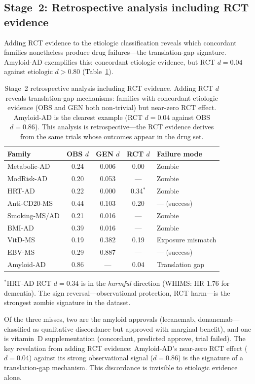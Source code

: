 \documentclass[11pt]{article}
\begin{document}
\subsection{Stage~2: Retrospective analysis including RCT evidence}
\label{sec:stage2}

Adding RCT evidence to the etiologic classification reveals which concordant families nonetheless produce drug failures---the translation-gap signature. Amyloid-AD exemplifies this: concordant etiologic evidence, but RCT $d = 0.04$ against etiologic $d > 0.80$ (Table~\ref{tab:stage2}).

\begin{table}[t]
\centering
\caption{Stage~2 retrospective analysis including RCT evidence. Adding RCT $d$ reveals translation-gap mechanisms: families with concordant etiologic evidence (OBS and GEN both non-trivial) but near-zero RCT effect. Amyloid-AD is the clearest example (RCT $d = 0.04$ against OBS $d = 0.86$). This analysis is retrospective---the RCT evidence derives from the same trials whose outcomes appear in the drug set.}
\label{tab:stage2}
\begin{tabular}{lcccl}
\toprule
Family & OBS $d$ & GEN $d$ & RCT $d$ & Failure mode \\
\midrule
Metabolic-AD & 0.24 & 0.006 & 0.00 & Zombie \\
ModRisk-AD & 0.20 & 0.053 & --- & Zombie \\
HRT-AD & 0.22 & 0.000 & 0.34$^*$ & Zombie \\
Anti-CD20-MS & 0.44 & 0.103 & 0.20 & --- (success) \\
Smoking-MS/AD & 0.21 & 0.016 & --- & Zombie \\
BMI-AD & 0.39 & 0.016 & --- & Zombie \\
VitD-MS & 0.19 & 0.382 & 0.19 & Exposure mismatch \\
EBV-MS & 0.29 & 0.887 & --- & --- (success) \\
Amyloid-AD & 0.86 & --- & 0.04 & Translation gap \\
\bottomrule
\end{tabular}

\vspace{1mm}
{\footnotesize $^*$HRT-AD RCT $d = 0.34$ is in the \emph{harmful} direction (WHIMS: HR 1.76 for dementia). The sign reversal---observational protection, RCT harm---is the strongest zombie signature in the dataset.}
\end{table}

Of the three misses, two are the amyloid approvals (lecanemab, donanemab---classified as qualitative discordance but approved with marginal benefit), and one is vitamin~D supplementation (concordant, predicted approve, trial failed). The key revelation from adding RCT evidence: Amyloid-AD's near-zero RCT effect ($d = 0.04$) against its strong observational signal ($d = 0.86$) is the signature of a translation-gap mechanism. This discordance is invisible to etiologic evidence alone.
\end{document}
